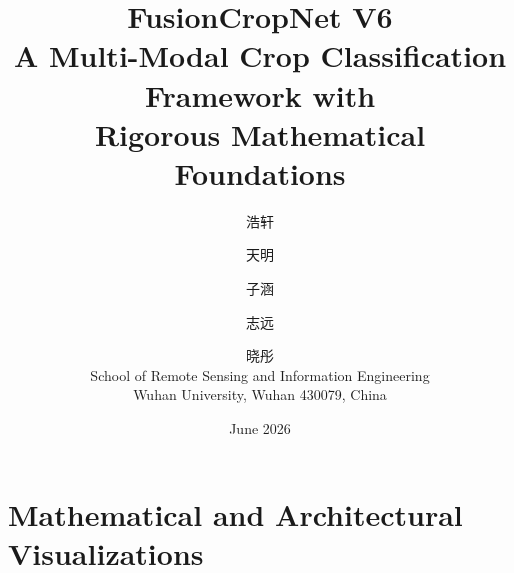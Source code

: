 \documentclass[12pt,a4paper]{article}
\title{\textbf{FusionCropNet V6}\\[6pt]
       \large A Multi-Modal Crop Classification Framework with\\
       Rigorous Mathematical Foundations}
\author{浩轩 \and 天明 \and 子涵 \and 志远 \and 晓彤\\
        {\small School of Remote Sensing and Information Engineering}\\
        {\small Wuhan University, Wuhan 430079, China}}
\date{June 2026}
\theoremstyle{remark}
\begin{document}
\maketitle

\begin{abstract}

\end{abstract}

\tableofcontents
\newpage











\newpage
\section{Mathematical and Architectural Visualizations}


\appendix




\end{document}
